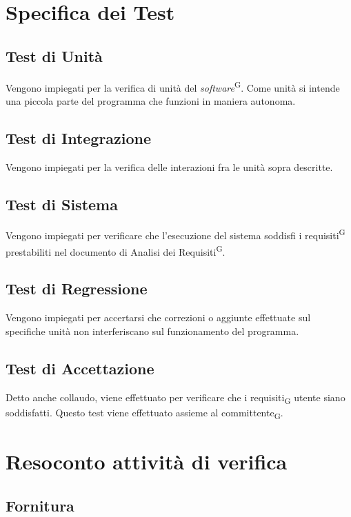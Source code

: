 \documentclass[5pt]{article}
\begin{document}
	
	\section{Specifica dei Test}
	
	\subsection{Test di Unità}
	Vengono impiegati per la verifica di unità del \textit{software}\textsuperscript{G}. Come unità si intende una piccola parte del programma che funzioni in maniera autonoma.
	
	\subsection{Test di Integrazione}
	Vengono impiegati per la verifica delle interazioni fra le unità sopra descritte.
	
	\subsection{Test di Sistema}
	Vengono impiegati per verificare che l'esecuzione del sistema soddisfi i requisiti\textsuperscript{G} prestabiliti nel documento di Analisi dei Requisiti\textsuperscript{G}.
	
	\subsection{Test di Regressione}
	Vengono impiegati per accertarsi che correzioni o aggiunte effettuate sul specifiche unità non interferiscano sul funzionamento del programma.
	
	\subsection{Test di Accettazione}
	Detto anche collaudo, viene effettuato per verificare che i requisiti\textsubscript{G} utente siano soddisfatti. Questo test viene effettuato assieme al committente\textsubscript{G}.
	
	
	\section{Resoconto attività di verifica}
	
	\subsection{Fornitura}
\end{document}
